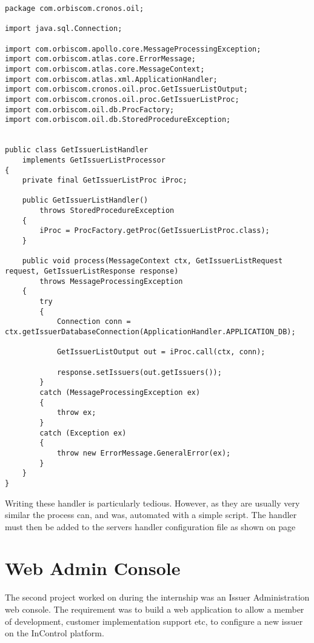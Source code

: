 \documentclass[a4paper, 11pt, titlepage]{article}
\begin{document}
\begin{verbatim}
package com.orbiscom.cronos.oil;

import java.sql.Connection;

import com.orbiscom.apollo.core.MessageProcessingException;
import com.orbiscom.atlas.core.ErrorMessage;
import com.orbiscom.atlas.core.MessageContext;
import com.orbiscom.atlas.xml.ApplicationHandler;
import com.orbiscom.cronos.oil.proc.GetIssuerListOutput;
import com.orbiscom.cronos.oil.proc.GetIssuerListProc;
import com.orbiscom.oil.db.ProcFactory;
import com.orbiscom.oil.db.StoredProcedureException;


public class GetIssuerListHandler
	implements GetIssuerListProcessor
{
	private final GetIssuerListProc iProc;

	public GetIssuerListHandler()
		throws StoredProcedureException
	{
		iProc = ProcFactory.getProc(GetIssuerListProc.class);
	}

	public void process(MessageContext ctx, GetIssuerListRequest request, GetIssuerListResponse response)
		throws MessageProcessingException
	{
		try
		{
			Connection conn = ctx.getIssuerDatabaseConnection(ApplicationHandler.APPLICATION_DB);

			GetIssuerListOutput out = iProc.call(ctx, conn);

			response.setIssuers(out.getIssuers());
		}
		catch (MessageProcessingException ex)
		{
			throw ex;
		}
		catch (Exception ex)
		{
			throw new ErrorMessage.GeneralError(ex);
		}
	}
}
\end{verbatim}
Writing these handler is particularly tedious. However, as they are usually very similar the process can, and was, automated with a simple script.
The handler must then be added to the servers handler configuration file as shown on page \pageref{handlerset}

\cite{Stored procedure for dummys}
\cite{http://wiki.orbiscom.com/index.php/OIL}

\section{Web Admin Console}
The second project worked on during the internship was an Issuer Administration web console. The requirement was to build a web application to allow a member of development, customer implementation support etc, to configure a new issuer on the InControl platform.
\end{document}
